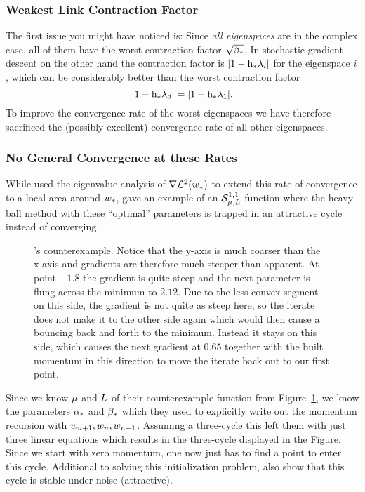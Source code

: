 \subsubsection{Weakest Link Contraction Factor}

The first issue you
might have noticed is: Since \emph{all eigenspaces} are in the complex case,
all of them have the worst contraction factor \(\sqrt{\beta_*}\). In stochastic
gradient descent on the other hand the contraction factor is \(|1-\text{h}_*\lambda_i|\)
for the eigenspace \(i\), which can be considerably better than the worst
contraction factor 
\[|1-\text{h}_*\lambda_d|=|1-\text{h}_*\lambda_1|.\]
To improve the convergence rate of the worst eigenspaces we have therefore
sacrificed the (possibly excellent) convergence rate of all other eigenspaces.

\subsubsection{No General Convergence at these Rates}

While
\textcite[pp. 65-67]{polyakIntroductionOptimization1987} used the eigenvalue
analysis of \(\nabla\mathcal{L}^2(w_*)\) to extend this rate of convergence
to a local area around \(w_*\), \textcite[pp. 78-79]{lessardAnalysisDesignOptimization2016}
gave an example of an \(\mathcal{S}^{1,1}_{{\mu},{L}}\) function where
the heavy ball method with these ``optimal'' parameters is trapped in an attractive
cycle instead of converging. 
%
\begin{figure}[h]
	\centering
	\def\svgwidth{1\textwidth}
	
	\caption{
		\citeauthor{lessardAnalysisDesignOptimization2016}'s counterexample.
		Notice that the y-axis is much coarser than the x-axis and gradients are
		therefore much steeper than apparent. At point \(-1.8\) the gradient is
		quite steep and the next parameter is flung across the minimum to
		\(2.12\). Due to the less convex segment on this side, the gradient is
		not quite as steep here, so the iterate does not make it to the other
		side again which would then cause a bouncing back and forth to the
		minimum. Instead it stays on this side, which causes the next gradient
		at \(0.65\) together with the built momentum in this direction to move the
		iterate back out to our first point.
	}
	\label{fig: heavy ball counterexample}
\end{figure}

Since we know \(\mu\) and \(L\) of their counterexample function from
Figure~\ref{fig: heavy ball counterexample}, we know the parameters \(\alpha_*\)
and \(\beta_*\) which they used to explicitly write out the momentum recursion
with \(w_{n+1}, w_{n}, w_{n-1}\). Assuming a three-cycle
this left them with just three linear equations which results in the three-cycle
displayed in the Figure. Since we start with zero momentum, one now just has to
find a point to enter this cycle. Additional to solving this initialization
problem, \textcite[pp. 93-94]{lessardAnalysisDesignOptimization2016} also show
that this cycle is stable under noise (attractive).


